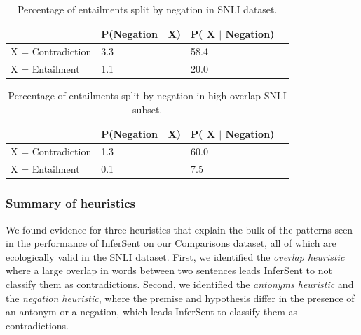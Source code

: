 \begin{table}[htb]
  \begin{tabular}{llll}
  \toprule
    & P(Negation $|$ X) & P( X $|$ Negation) \\
    \midrule
    X = Contradiction & 3.3  & 58.4  \\
      X = Entailment &  1.1  &  20.0  \\
\bottomrule
  \end{tabular}
 \caption{Percentage of entailments split by negation in SNLI dataset.}
  \label{tab:negation}
\end{table}
%

\begin{table}[htb]
  \begin{tabular}{llll}
  \toprule
    & P(Negation $|$ X) & P( X $|$ Negation) \\
    \midrule
    X = Contradiction & 1.3 & 60.0 \\
      X = Entailment &  0.1 &  7.5 \\
\bottomrule 
  \end{tabular}
 \caption{Percentage of entailments split by negation in high overlap SNLI subset.}
  \label{tab:negation-ho}
\end{table}


\subsubsection{Summary of heuristics}

We found evidence for three heuristics that explain the bulk of the patterns seen in the performance of InferSent on our Comparisons dataset, all of which are ecologically valid in the SNLI dataset. First, we identified the \textit{overlap heuristic} where a large overlap in words between two sentences leads InferSent to not classify them as contradictions. Second, we identified the \textit{antonyms heuristic} and the \textit{negation heuristic}, where the premise and hypothesis differ in the presence of an antonym or a negation, which leads InferSent to classify them as contradictions. 

